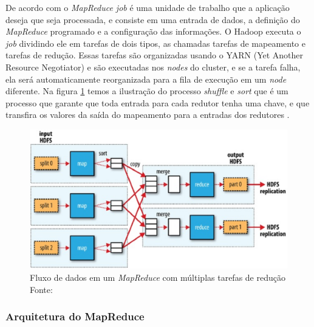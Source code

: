             De acordo com  o \textit{MapReduce job} é uma unidade de trabalho que a aplicação
            deseja que seja processada, e consiste em uma entrada de dados, a definição do \textit{MapReduce} programado
            e a configuração das informações. O Hadoop executa o \textit{job} dividindo ele em tarefas de dois tipos, as
            chamadas tarefas de mapeamento e tarefas de redução. Essas tarefas são organizadas usando o YARN (Yet
            Another Resource Negotiator) e são executadas nos \textit{nodes} do cluster, e se a tarefa falha, ela será
            automaticamente reorganizada para a fila de execução em um \textit{node} diferente. Na figura \ref{figura5}
            temos a ilustração do processo \textit{shuffle} e \textit{sort} que é um processo que garante que toda entrada para
            cada redutor tenha uma chave, e que transfira os valores da saída do mapeamento para a entradas dos
            redutores \cite{white2015}.

            \begin{figure}[ht!]
                    \centering
                    \includegraphics[keepaspectratio=true,scale=0.75]
                        {figuras/figura5.eps}
                    \caption[Fluxo de dados em um \textit{MapReduce} com múltiplas tarefas de redução]
                    {Fluxo de dados em um \textit{MapReduce} com múltiplas tarefas de redução
                    \protect \linebreak Fonte: }
                    \label{figura5}
            \end{figure}

            \subsubsection{Arquitetura do MapReduce}

